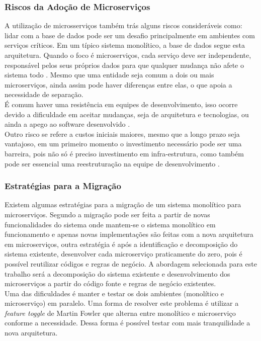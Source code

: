 \documentclass[12pt]{article}
\begin{document}
\subsubsection{Riscos da Adoção de Microserviços}
A utilização de microsserviços também trás alguns riscos consideráveis como: lidar com a base de dados pode ser um desafio principalmente em ambientes com serviços críticos. Em um típico sistema monolítico, a base de dados segue esta arquitetura. Quando o foco é microserviços, cada serviço deve ser independente, responsável pelos seus próprios dados para que qualquer mudança não afete o sistema todo \cite{Kholy2019}. Mesmo que uma entidade seja comum a dois ou mais microserviços, ainda assim pode haver diferenças entre elas, o que apoia a necessidade de separação. 
\\É comum haver uma resistência em equipes de desenvolvimento, isso ocorre devido a dificuldade em aceitar mudanças, seja de arquitetura e tecnologias, ou ainda a apego ao software desenvolvido \cite{Taibi}. 
\\Outro risco se refere a custos iniciais maiores, mesmo que a longo prazo seja vantajoso, em um primeiro momento o investimento necessário pode ser uma barreira, pois não só é preciso investimento em infra-estrutura, como também pode ser essencial uma reestruturação na equipe de desenvolvimento \cite{Taibi}.

\subsubsection{Estratégias para a Migração}

Existem algumas estratégias para a migração de um sistema monolítico para microserviços. Segundo \cite{Taibi} a migração pode ser feita a partir de novas funcionalidades do sistema onde mantem-se o sistema monolítico em funcionamento e apenas novas implementações são feitas com a nova arquitetura em microserviços, outra estratégia é após a identificação e decomposição do sistema existente, desenvolver cada microserviço praticamente do zero, pois é possível reutilizar códigos e regras de negócio. A abordagem selecionada para este trabalho será a decomposição do sistema existente e desenvolvimento dos microserviços a partir do código fonte e regras de negócio existentes. 
\\Uma das dificuldades é manter e testar os dois ambientes (monolítico e microserviço) em paralelo. Uma forma de resolver este problema é utilizar a \textit{feature toggle} de Martin Fowler \cite{Carvalho2019} que alterna entre monolítico e microserviço conforme a necessidade. Dessa forma é possível testar com mais tranquilidade a nova arquitetura. 
\end{document}
